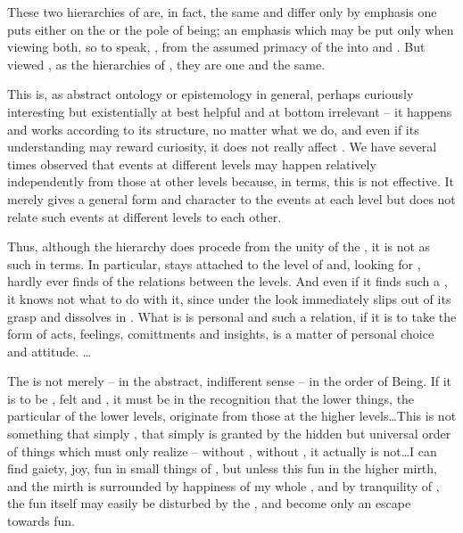 These two hierarchies of  are, in fact, the same and differ 
only by emphasis one puts either on the  or the 
 pole of being; an emphasis which may be put only 
when viewing both, so to speak, , from the assumed 
primacy of the  into  and . 
But viewed , as the hierarchies of , they are 
one and the same. 

\pa This  is, as abstract ontology or epistemology in
general, perhaps curiously interesting but existentially at best
helpful and at bottom irrelevant -- it happens and works according to
its structure, no matter what we do, and even if its understanding may
reward  curiosity, it does not really affect .  We have
several times observed that events at different levels may happen
relatively independently from those at other levels because, in
 terms, this  is not effective.  It merely
gives a general form and character to the events at each level but
does not relate  such events at different levels to
each other.

\pa Thus, although the hierarchy does procede from the unity of the
, it is not  as such in 
terms.  In particular,  stays attached to the level of
 and, looking for , hardly ever finds
 of the  relations between the levels.  And
even if it finds such a , it knows not what to do with it,
since under the  look  immediately slips
out of its  grasp and dissolves in . 
What is  is personal and such a relation, if it is
to take the form of  acts, feelings, comittments and
insights, is a matter of personal choice and attitude.  \ldots

\pa The  is not merely  -- in
the abstract, indifferent sense -- in the order of Being.  If it is to
be , felt and , it must be 
in the  recognition that the lower things, the particular
 of the lower levels, originate from those at the
higher levels\ldots This is not something that simply , that simply is granted by the hidden but universal order of
things which  must only realize -- without , without
, it actually is not\ldots I can find gaiety, joy, fun
in small things of , but unless this fun
 in the higher mirth, and the mirth is
surrounded by happiness of my whole , and by tranquility of
, the fun itself may easily be disturbed by the
, and become only an escape towards  fun. 
%

